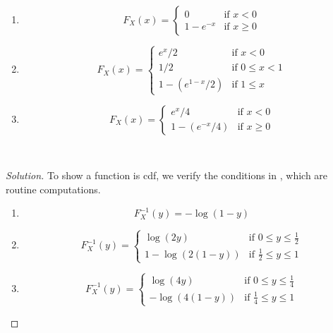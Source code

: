 \documentclass[12pt,letterpaper,reqno]{amsart}
\numberwithin{equation}{subsection}
\begin{document}
\begin{enumerate}[label=(\alph*),leftmargin=*]
    \item
    
    \[ F_X(x) = \left\{ \begin{array}{cl}
         0 & \mbox{if $x < 0$} \\
         1 - e^{-x} & \mbox{if $x \geq 0$}
    \end{array} \right. \]
    
        \item
    
    \[ F_X(x) = \left\{ \begin{array}{cl}
         e^x/2 & \mbox{if $x < 0$} \\
         1/2 & \mbox{if $0 \leq x < 1$} \\
         1-(e^{1-x}/2) & \mbox{if $1 \leq x$}
    \end{array} \right. \]
    
        \item
    
    \[ F_X(x) = \left\{ \begin{array}{cl}
         e^x/4 & \mbox{if $x < 0$} \\
         1 - (e^{-x}/4) & \mbox{if $x \geq 0$}
    \end{array} \right. \]
\end{enumerate}~\\

\begin{proof}[Solution] To show a function is cdf, we verify the conditions in \cite[Theorem 1.5.3 on page 31]{Berger-Casella}, which are routine computations.

\begin{enumerate}[label = (\alph*),leftmargin=*]
    \item 
    
    \[ F_X^{-1}(y) = -\log(1-y) \]
    
    \item 
    
    \[ F_X^{-1}(y) = \left\{ \begin{array}{cl}
         \log(2y) & \mbox{if $0 \leq y \leq \frac{1}{2}$} \\
         1 -\log(2(1-y)) & \mbox{if $\frac{1}{2} \leq y \leq 1$}
    \end{array} \right. \]
    
    \item 
    
    \[ F_X^{-1}(y) = \left\{ \begin{array}{cl}
         \log(4y) & \mbox{if $0 \leq y \leq \frac{1}{4}$} \\
         -\log(4(1-y)) & \mbox{if $\frac{1}{4} \leq y \leq 1$}
    \end{array} \right. \]
\end{enumerate}
\end{proof}
\end{document}

